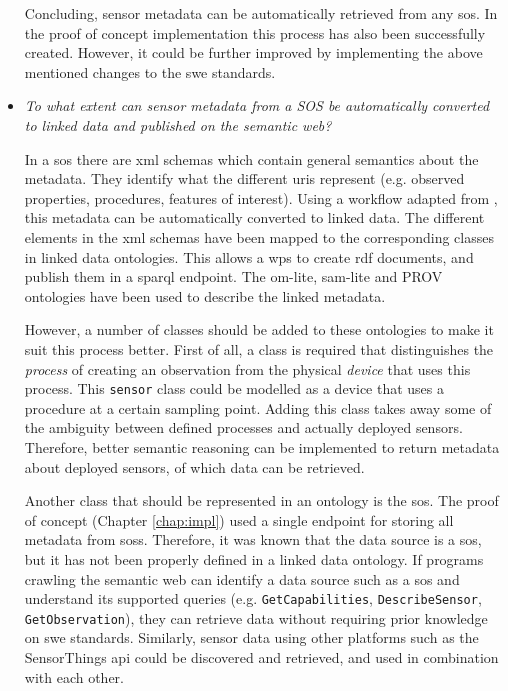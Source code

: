 \begin{itemize}
Concluding, sensor metadata can be automatically retrieved from any \ac{sos}. In the proof of concept implementation this process has also been successfully created. However, it could be further improved by implementing the above mentioned changes to the \ac{swe} standards.

\item \textit{To what extent can sensor metadata from a SOS be automatically converted to linked data and published on the semantic web?}%

In a \ac{sos} there are \ac{xml} schemas which contain general semantics about the metadata. They identify what the different \acp{uri} represent (e.g. observed properties, procedures, features of interest). Using a workflow adapted from \cite{LD:Missier}, this metadata can be automatically converted to linked data. The different elements in the \ac{xml} schemas have been mapped to the corresponding classes in linked data ontologies. This allows a \ac{wps} to create \ac{rdf} documents, and publish them in a \acs{sparql} endpoint. The om-lite, sam-lite and PROV ontologies have been used to describe the linked metadata.

However, a number of classes should be added to these ontologies to make it suit this process better. First of all, a class is required that distinguishes the \textit{process} of creating an observation from the physical \textit{device} that uses this process. This \texttt{sensor} class could be modelled as a device that uses a procedure at a certain sampling point. Adding this class takes away some of the ambiguity between defined processes and actually deployed sensors. Therefore, better semantic reasoning can be implemented to return metadata about deployed sensors, of which data can be retrieved.  

Another class that should be represented in an ontology is the \acl{sos}. The proof of concept (Chapter \ref{chap:impl}) used a single endpoint for storing all metadata from \aclp{sos}. Therefore, it was known that the data source is a \ac{sos}, but it has not been properly defined in a linked data ontology. If programs crawling the semantic web can identify a data source such as a \ac{sos} and understand its supported queries (e.g. \texttt{GetCapabilities}, \texttt{DescribeSensor}, \texttt{GetObservation}), they can retrieve data without requiring prior knowledge on \ac{swe} standards. Similarly, sensor data using other platforms such as the SensorThings \acs{api} could be discovered and retrieved, and used in combination with each other.           


\end{itemize}
